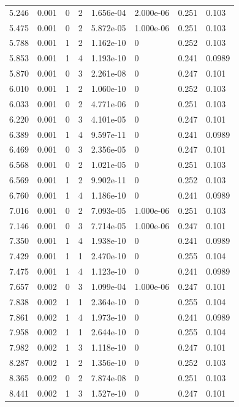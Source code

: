 \documentclass[preview]{standalone}
\begin{document}
{{\begin{tabular}{L{1.2cm}C{1.2cm} C{0.3cm}C{0.5cm} C{1.4cm}C{1.4cm} C{1.4cm}C{1.4cm}}
  5.246  &  0.001  & 0     &  2 &  1.656e-04  & 2.000e-06  & 0.251 &  0.103   \\ 
  5.475  &  0.001  & 0     &  2 &  5.872e-05  & 1.000e-06  & 0.251 &  0.103   \\ 
  5.788  &  0.001  & 1     &  2 &  1.162e-10  & 0  & 0.252 &  0.103   \\ 
  5.853  &  0.001  & 1     &  4 &  1.193e-10  & 0  & 0.241 &  0.0989   \\ 
  5.870  &  0.001  & 0     &  3 &  2.261e-08  & 0  & 0.247 &  0.101   \\ 
  6.010  &  0.001  & 1     &  2 &  1.060e-10  & 0  & 0.252 &  0.103   \\ 
  6.033  &  0.001  & 0     &  2 &  4.771e-06  & 0  & 0.251 &  0.103   \\ 
  6.220  &  0.001  & 0     &  3 &  4.101e-05  & 0  & 0.247 &  0.101   \\ 
  6.389  &  0.001  & 1     &  4 &  9.597e-11  & 0  & 0.241 &  0.0989   \\ 
  6.469  &  0.001  & 0     &  3 &  2.356e-05  & 0  & 0.247 &  0.101   \\ 
  6.568  &  0.001  & 0     &  2 &  1.021e-05  & 0  & 0.251 &  0.103   \\ 
  6.569  &  0.001  & 1     &  2 &  9.902e-11  & 0  & 0.252 &  0.103   \\ 
  6.760  &  0.001  & 1     &  4 &  1.186e-10  & 0  & 0.241 &  0.0989   \\ 
  7.016  &  0.001  & 0     &  2 &  7.093e-05  & 1.000e-06  & 0.251 &  0.103   \\ 
  7.146  &  0.001  & 0     &  3 &  7.714e-05  & 1.000e-06  & 0.247 &  0.101   \\ 
  7.350  &  0.001  & 1     &  4 &  1.938e-10  & 0  & 0.241 &  0.0989   \\ 
  7.429  &  0.001  & 1     &  1 &  2.470e-10  & 0  & 0.255 &  0.104   \\ 
  7.475  &  0.001  & 1     &  4 &  1.123e-10  & 0  & 0.241 &  0.0989   \\ 
  7.657  &  0.002  & 0     &  3 &  1.099e-04  & 1.000e-06  & 0.247 &  0.101   \\ 
  7.838  &  0.002  & 1     &  1 &  2.364e-10  & 0  & 0.255 &  0.104   \\ 
  7.861  &  0.002  & 1     &  4 &  1.973e-10  & 0  & 0.241 &  0.0989   \\ 
  7.958  &  0.002  & 1     &  1 &  2.644e-10  & 0  & 0.255 &  0.104   \\ 
  7.982  &  0.002  & 1     &  3 &  1.118e-10  & 0  & 0.247 &  0.101   \\ 
  8.287  &  0.002  & 1     &  2 &  1.356e-10  & 0  & 0.252 &  0.103   \\ 
  8.365  &  0.002  & 0     &  2 &  7.874e-08  & 0  & 0.251 &  0.103   \\ 
  8.441  &  0.002  & 1     &  3 &  1.527e-10  & 0  & 0.247 &  0.101   \\ 
\hline 
\end{tabular} 

}}
\end{document}
